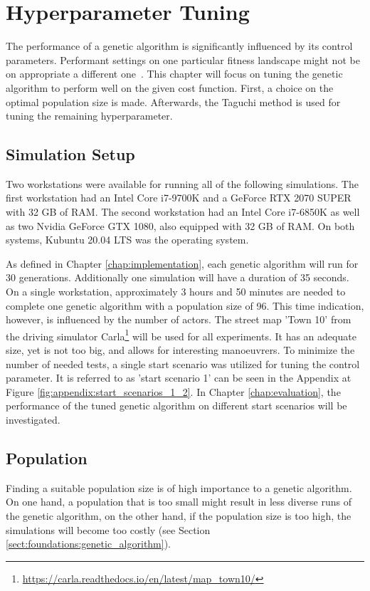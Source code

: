 \chapter{Hyperparameter Tuning}
\label{chap:hyperparameter_tuning}
The performance of a genetic algorithm is significantly influenced by its control parameters. Performant settings on one particular fitness landscape might not be on appropriate a different one~\cite{kacprzyk_parameter_2007}. This chapter will focus on tuning the genetic algorithm to perform well on the given cost function. First, a choice on the optimal population size is made. Afterwards, the Taguchi method is used for tuning the remaining hyperparameter.

\section{Simulation Setup}
\label{sect:hyperparameter_tuning:simulation_setup}
Two workstations were available for running all of the following simulations. The first workstation had an Intel Core i7-9700K and a GeForce RTX 2070 SUPER with 32 GB of RAM. The second workstation had an Intel Core i7-6850K as well as two Nvidia GeForce GTX 1080, also equipped with 32 GB of RAM. On both systems, Kubuntu 20.04 LTS was the operating system.

As defined in Chapter \ref{chap:implementation}, each genetic algorithm will run for 30 generations. Additionally one simulation will have a duration of 35 seconds. On a single workstation, approximately 3 hours and 50 minutes are needed to complete one genetic algorithm with a population size of 96. This time indication, however, is influenced by the number of actors. The street map 'Town 10' from the driving simulator Carla\footnote{\href{https://carla.readthedocs.io/en/latest/map_town10/}{https://carla.readthedocs.io/en/latest/map\_town10/}} will be used for all experiments. It has an adequate size, yet is not too big, and allows for interesting manoeuvrers. To minimize the number of needed tests, a single start scenario was utilized for tuning the control parameter. It is referred to as 'start scenario 1' can be seen in the Appendix at Figure \ref{fig:appendix:start_scenarios_1_2}. In Chapter \ref{chap:evaluation}, the performance of the tuned genetic algorithm on different start scenarios will be investigated.

\section{Population}
\label{sect:hyperparameter_tuning:population}
Finding a suitable population size is of high importance to a genetic algorithm. On one hand, a population that is too small might result in less diverse runs of the genetic algorithm, on the other hand, if the population size is too high, the simulations will become too costly (see Section \ref{sect:foundations:genetic_algorithm}).

